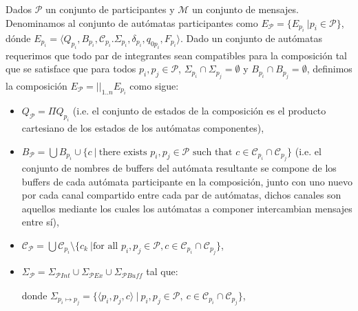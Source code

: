 \begin{definition}
Dados $\mathcal{P}$ un conjunto de participantes y $\mathcal{M}$ un conjunto de mensajes. Denominamos al conjunto de autómatas participantes como $E_\mathcal{P} = \{E_{p_i} \ | p_i \in \mathcal{P}\}$, dónde $E_{p_i}= \langle Q_{p_i}, B_{p_i}, \mathcal{C}_{p_i}. \Sigma_{p_i}, \delta_{p_i}, q_{0{p_i}}, F_{p_i} \rangle$. Dado un conjunto de autómatas requerimos que todo par de integrantes sean compatibles para la composición tal que se satisface que para todos $p_i, p_j \in \mathcal{P}$, $\Sigma_{p_i} \cap \Sigma_{p_j}= \emptyset$ y $B_{p_i} \cap B_{p_j} = \emptyset$, definimos la composición $E_\mathcal{P} = ||_{1..n} E_{p_i}$ como sigue:
\begin{itemize}
    \item $Q_\mathcal{P}= \Pi Q_{p_i}$ (i.e. el conjunto de estados de la composición es el producto cartesiano de los estados de los autómatas componentes),    
    \item $B_\mathcal{P} = \bigcup B_{p_i} \cup \{ c \ | \ \mbox{there exists } p_i, p_j \in \mathcal{P} \mbox{ such that } c \in \mathcal{C}_{p_i} \cap \mathcal{C}_{p_j} \}$ (i.e. el conjunto de nombres de buffers del autómata resultante se compone de los buffers de cada autómata participante en la composición, junto con uno nuevo por cada canal compartido entre cada par de autómatas, dichos canales son aquellos mediante los cuales los autómatas a componer intercambian mensajes entre sí),    
    \item $\mathcal{C}_\mathcal{P} = \bigcup \mathcal{C}_{p_i} \setminus \{ c_k \ | \mbox{for all } p_i, p_j \in \mathcal{P}, c \in \mathcal{C}_{p_i} \cap \mathcal{C}_{p_j} \}$,    
    \item $\Sigma_\mathcal{P} = \Sigma_{\mathcal{P}\mathit{Int}} \cup \Sigma_{\mathcal{P}\mathit{Ex}} \cup \Sigma_{\mathcal{P}\mathit{Buff}}$ tal que:    
donde $\Sigma_\mathit{p_i \mapsto p_j} =\{ \langle p_i,p_j,c \rangle \ | \ p_i, p_j \in \mathcal{P}, \  c \in \mathcal{C}_{p_i} \cap \mathcal{C}_{p_j}\}$,

\end{itemize}
\end{definition}
